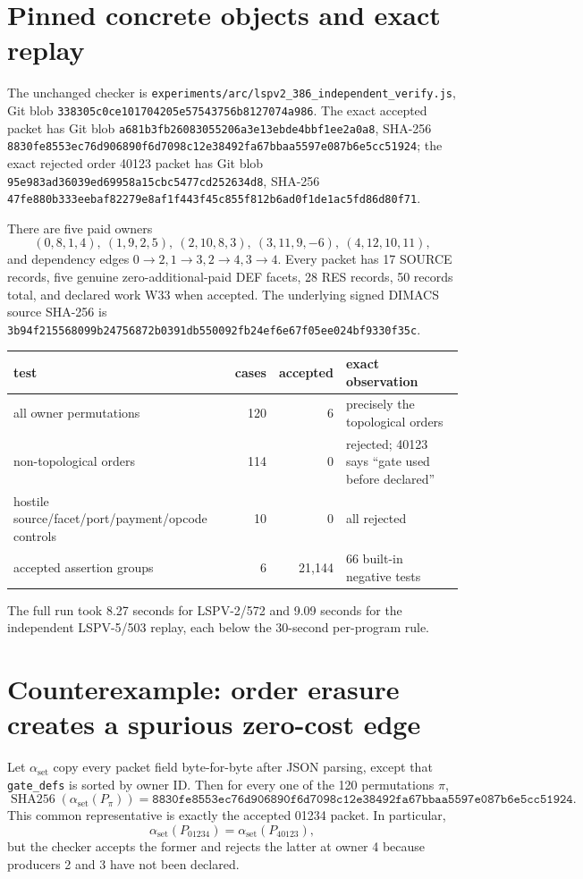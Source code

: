 \documentclass[11pt]{article}
\begin{document}
\section{Pinned concrete objects and exact replay}
The unchanged checker is \texttt{experiments/arc/lspv2\_386\_independent\_verify.js}, Git blob
\texttt{338305c0ce101704205e57543756b8127074a986}.  The exact accepted packet has Git blob
\texttt{a681b3fb26083055206a3e13ebde4bbf1ee2a0a8}, SHA-256
\texttt{8830fe8553ec76d906890f6d7098c12e38492fa67bbaa5597e087b6e5cc51924}; the exact rejected order 40123 packet has Git blob
\texttt{95e983ad36039ed69958a15cbc5477cd252634d8}, SHA-256
\texttt{47fe880b333eebaf82279e8af1f443f45c855f812b6ad0f1de1ac5fd86d80f71}.

There are five paid owners
\[
(0,8,1,4),\ (1,9,2,5),\ (2,10,8,3),\ (3,11,9,-6),\ (4,12,10,11),
\]
and dependency edges \(0\to2,1\to3,2\to4,3\to4\).  Every packet has 17 SOURCE records, five genuine zero-additional-paid DEF facets, 28 RES records, 50 records total, and declared work W33 when accepted.  The underlying signed DIMACS source SHA-256 is
\texttt{3b94f215568099b24756872b0391db550092fb24ef6e67f05ee024bf9330f35c}.

\begin{center}
\begin{tabular}{lrrl}
\toprule
test & cases & accepted & exact observation\\
\midrule
all owner permutations & 120 & 6 & precisely the topological orders\\
non-topological orders & 114 & 0 & rejected; 40123 says ``gate used before declared''\\
hostile source/facet/port/payment/opcode controls & 10 & 0 & all rejected\\
accepted assertion groups & 6 & 21,144 & 66 built-in negative tests\\
\bottomrule
\end{tabular}
\end{center}
The full run took 8.27 seconds for LSPV-2/572 and 9.09 seconds for the independent LSPV-5/503 replay, each below the 30-second per-program rule.

\section{Counterexample: order erasure creates a spurious zero-cost edge}
Let \(\alpha_{\mathrm{set}}\) copy every packet field byte-for-byte after JSON parsing, except that \texttt{gate\_defs} is sorted by owner ID.  Then for every one of the 120 permutations \(\pi\),
\[
 \operatorname{SHA256}(\alpha_{\mathrm{set}}(P_\pi))
 =\texttt{8830fe8553ec76d906890f6d7098c12e38492fa67bbaa5597e087b6e5cc51924}.
\]
This common representative is exactly the accepted 01234 packet.  In particular,
\[
\alpha_{\mathrm{set}}(P_{01234})=\alpha_{\mathrm{set}}(P_{40123}),
\]
but the checker accepts the former and rejects the latter at owner 4 because producers 2 and 3 have not been declared.
\end{document}
